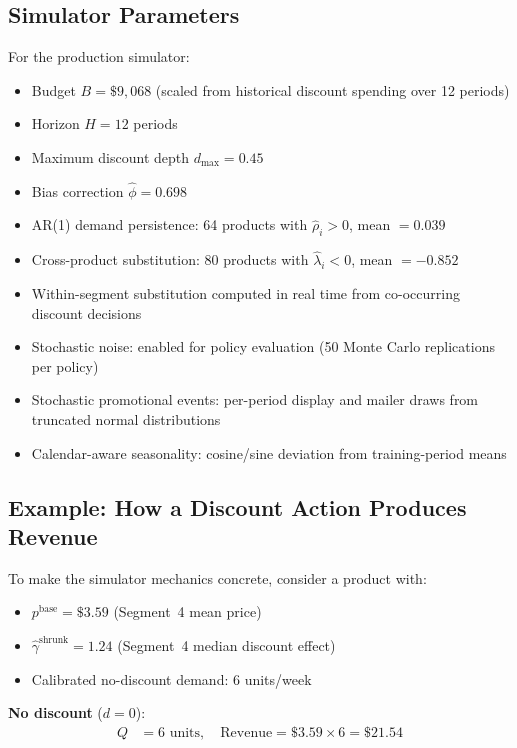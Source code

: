 \documentclass[12pt,a4paper]{article}
\begin{document}
\subsection{Simulator Parameters}

For the production simulator:
\begin{itemize}[nosep]
\item Budget $B = \$9{,}068$ (scaled from historical discount
spending over 12 periods)
\item Horizon $H = 12$ periods
\item Maximum discount depth $d_{\max} = 0.45$
\item Bias correction $\hat{\phi} = 0.698$
\item AR(1) demand persistence: 64 products with
$\hat{\rho}_i > 0$, mean $= 0.039$
\item Cross-product substitution: 80 products with
$\hat{\lambda}_i < 0$, mean $= -0.852$
\item Within-segment substitution computed in real time from
co-occurring discount decisions
\item Stochastic noise: enabled for policy evaluation (50 Monte
Carlo replications per policy)
\item Stochastic promotional events: per-period display and mailer
draws from truncated normal distributions
\item Calendar-aware seasonality: cosine/sine deviation from
training-period means
\end{itemize}

\subsection{Example: How a Discount Action Produces Revenue}

To make the simulator mechanics concrete, consider a product with:
\begin{itemize}[nosep]
\item $p^{\text{base}} = \$3.59$ (Segment~4 mean price)
\item $\hat{\gamma}^{\text{shrunk}} = 1.24$ (Segment~4 median
discount effect)
\item Calibrated no-discount demand: 6 units/week
\end{itemize}

\noindent\textbf{No discount} ($d = 0$):
\begin{align*}
Q &= 6 \text{ units}, \quad
\text{Revenue} = \$3.59 \times 6 = \$21.54
\end{align*}
\end{document}
